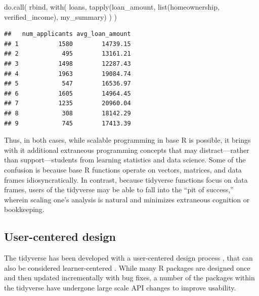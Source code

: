 \documentclass[12pt]{article}
\newenvironment{Shaded}{\begin{snugshade}}{\end{snugshade}}
\newcommand{\FunctionTok}[1]{\textcolor[rgb]{0.00,0.00,0.00}{#1}}
\newcommand{\NormalTok}[1]{#1}
\begin{document}
\linespread{1}

\begin{Shaded}
\begin{Highlighting}[]
\FunctionTok{do.call}\NormalTok{(}
\NormalTok{  rbind, }
  \FunctionTok{with}\NormalTok{(}
\NormalTok{    loans, }
    \FunctionTok{tapply}\NormalTok{(loan\_amount, }\FunctionTok{list}\NormalTok{(homeownership, verified\_income), my\_summary)}
\NormalTok{  )}
\NormalTok{)}
\end{Highlighting}
\end{Shaded}

\begin{verbatim}
##   num_applicants avg_loan_amount
## 1           1580        14739.15
## 2            495        13161.21
## 3           1498        12287.43
## 4           1963        19084.74
## 5            547        16536.97
## 6           1605        14964.45
## 7           1235        20960.04
## 8            308        18142.29
## 9            745        17413.39
\end{verbatim}


\label{base-scaling-3} \linespread{2}
\vspace{3mm}\setlength{\parindent}{15pt}

Thus, in both cases, while scalable programming in base R is possible,
it brings with it additional extraneous programming concepts that may
distract---rather than support---students from learning statistics and
data science. Some of the confusion is because base R functions operate
on vectors, matrices, and data frames idiosyncratically. In contrast,
because tidyverse functions focus on data frames, users of the tidyverse
may be able to fall into the ``pit of success,'' \citep{wickham2016user}
wherein scaling one's analysis is natural and minimizes extraneous
cognition or bookkeeping.

\hypertarget{sec:user-centered}{%
\subsection{User-centered design}\label{sec:user-centered}}

The tidyverse has been developed with a user-centered design process
\citep{kling1977organizational, norman1986}, that can also be considered
learner-centered \citep{solowayetal1994}. While many R packages are
designed once and then updated incrementally with bug fixes, a number of
the packages within the tidyverse have undergone large scale API changes
to improve usability.
\end{document}
